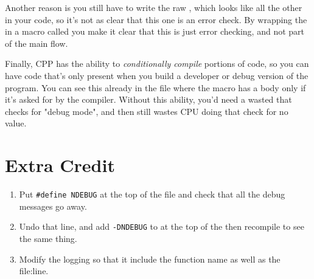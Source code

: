 Another reason is you still have to write the raw , which
looks like all the other  in your code, so it's not as
clear that this one is an error check.  By wrapping the 
in a macro called  you make it clear that this is just error
checking, and not part of the main flow.

Finally, CPP has the ability to \emph{conditionally compile} portions
of code, so you can have code that's only present when you build a developer
or debug version of the program.  You can see this already in the 
 file where the  macro has a body only if 
it's asked for by the compiler.  Without this ability, you'd need a 
wasted  that checks for "debug mode", and then still
wastes CPU doing that check for no value.


\section{Extra Credit}

\begin{enumerate}
\item Put \verb|#define NDEBUG| at the top of the file and check that all
    the debug messages go away.
\item Undo that line, and add \verb|-DNDEBUG| to  at the
    top of the  then recompile to see the same thing.
\item Modify the logging so that it include the function name as well
    as the file:line.
\end{enumerate}

